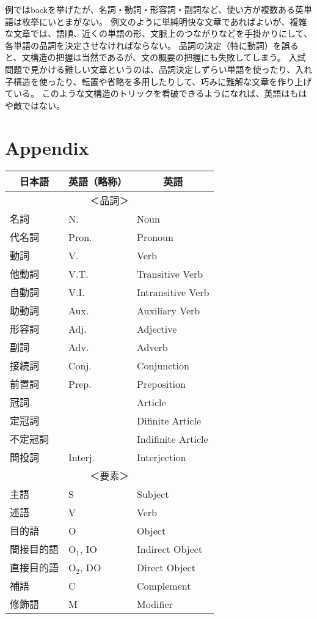 \documentclass[11pt,a4paper,titlepage]{jsarticle}
\begin{document}
例ではbackを挙げたが、名詞・動詞・形容詞・副詞など、使い方が複数ある英単語は枚挙にいとまがない。
例文のように単純明快な文章であればよいが、複雑な文章では、語順、近くの単語の形、文脈上のつながりなどを手掛かりにして、各単語の品詞を決定させなければならない。
品詞の決定（特に動詞）を誤ると、文構造の把握は当然であるが、文の概要の把握にも失敗してしまう。
入試問題で見かける難しい文章というのは、品詞決定しずらい単語を使ったり、入れ子構造を使ったり、転置や省略を多用したりして、巧みに難解な文章を作り上げている。
このような文構造のトリックを看破できるようになれば、英語はもはや敵ではない。


\section*{Appendix}

\begin{table}
  \centering
  \begin{tabular}{lll}
    \hline
    \multicolumn{1}{c}{日本語} & \multicolumn{1}{c}{英語（略称）} & \multicolumn{1}{c}{英語}\\
    \hline \hline
    \multicolumn{3}{c}{＜品詞＞}\\
    名詞 & N. & Noun\\
    代名詞 & Pron. & Pronoun\\
    動詞 & V. & Verb\\
    他動詞 & V.T. & Transitive Verb\\
    自動詞 & V.I. & Intransitive Verb\\
    助動詞 & Aux. & Auxiliary Verb\\
    形容詞 & Adj. & Adjective\\
    副詞 & Adv. & Adverb\\
    接続詞 & Conj. & Conjunction\\
    前置詞 & Prep. & Preposition\\
    冠詞 & & Article\\
    定冠詞 & & Difinite Article\\
    不定冠詞 & & Indifinite Article\\
    間投詞 & Interj. & Interjection\\
    \hline
    \multicolumn{3}{c}{＜要素＞}\\
    主語 & S & Subject\\
    述語 & V & Verb\\
    目的語 & O & Object\\
    間接目的語 & $\text{O}_1$, IO & Indirect Object\\
    直接目的語 & $\text{O}_2$, DO & Direct Object\\
    補語 & C & Complement\\
    修飾語 & M & Modifier\\
    \hline
  \end{tabular}
\end{table}
\end{document}
